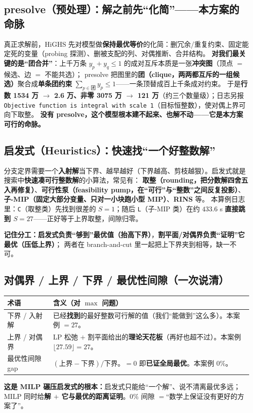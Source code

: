 \documentclass[11pt]{ctexart}
\newcommand{\code}[1]{\texttt{#1}}
\begin{document}
\subsection{presolve（预处理）：解之前先“化简”——本方案的命脉}
真正求解前，HiGHS 先对模型做\textbf{保持最优等价}的化简：删冗余/重复约束、固定能定死的变量（probing 探测）、删被支配的列、对偶推断、合并结构。
\textbf{对我们最关键的是“团合并”}：上千万条 $y_p+y_q\le1$ 的成对互斥本质是一张\textbf{冲突图}（顶点 $=$ 候选、边 $=$ 不能共选）；
presolve 把图里的\textbf{团（clique，两两都互斥的一组候选）}聚合成\textbf{单条团约束} $\sum_{p\in\text{团}}y_p\le1$——一条顶替成百上千条成对约束。
于是\textbf{行数 1534 万 $\to$ 2.6 万、非零 3075 万 $\to$ 121 万}（约三个数量级）；日志另报 \code{Objective function is integral with scale 1}（目标恒整数），使对偶上界可向下取整。
\textbf{没有 presolve，这个模型根本建不起来、也解不动——它是本方案可行的命脉。}

\subsection{启发式（Heuristics）：快速找“一个好整数解”}
分支定界需要一个\textbf{入射解}当下界、越早越好（下界越高、剪枝越狠）。启发式就是搜索中\textbf{快速凑可行整数解}的小算法，常见有：
\textbf{取整（rounding，把分数解四舍五入再修复）}、\textbf{可行性泵（feasibility pump，在“可行”与“整数”之间反复投影）}、
\textbf{子-MIP（固定大部分变量、只对一小块跑小型 MIP）}、\textbf{RINS} 等。
本算例日志里：\code{C}（取整类）先找到很差的 $S=1$；随后 \code{L}（子-MIP 类）在约 $433.6$ s \textbf{直接跳到 $S=27$}——正好等于上界取整，间隙归零。
\begin{key}\textbf{记住分工：}\textbf{启发式负责“够到”最优值（抬高下界）}，\textbf{割平面/对偶界负责“证明”它最优（压低上界）}；
两者在 branch-and-cut 里一起把上下界夹到相等，缺一不可。
\end{key}

\subsection{对偶界 / 上界 / 下界 / 最优性间隙（一次说清）}
\begin{center}\small
\begin{tabular}{@{}lp{11.2cm}@{}}
\toprule
术语 & 含义（对 $\max$ 问题） \\
\midrule
下界 / 入射解 & 已经\textbf{找到}的最好整数可行解的值（我们“能做到”这么多）。本案例 $=27$。 \\
上界 / 对偶界 & LP 松弛 $+$ 割平面给出的\textbf{理论天花板}（再好也超不过）。本案例 $\lfloor27.59\rfloor=27$。 \\
最优性间隙 gap & $(\text{上界}-\text{下界})/\text{下界}$。$=0$ 即\textbf{已证全局最优}。本案例 $0\%$。 \\
\bottomrule
\end{tabular}
\end{center}
\textbf{这是 MILP 碾压启发式的根本：}启发式只能给“一个解”、说不清离最优多远；
MILP 同时给\textbf{解 $+$ 它与最优的距离证明}。$0\%$ 间隙 $=$“数学上保证没有更好的方案了”。
\end{document}
